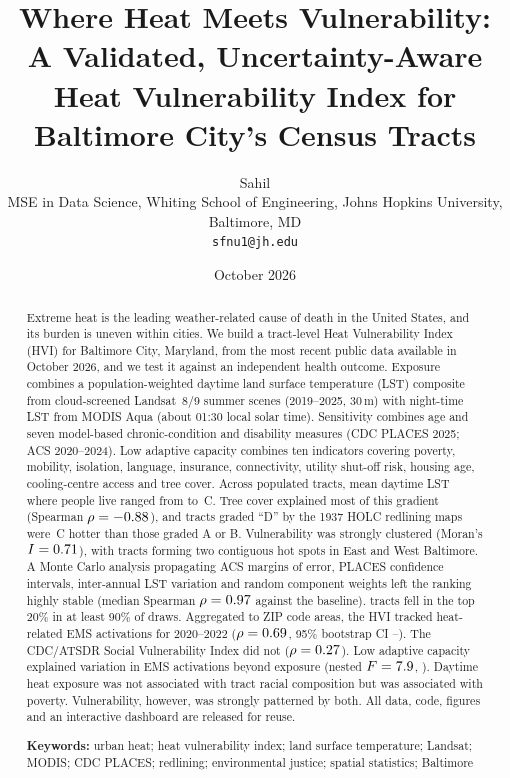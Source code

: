 \documentclass[11pt]{article}
\title{\textbf{Where Heat Meets Vulnerability:\\ A Validated, Uncertainty-Aware Heat Vulnerability Index for Baltimore City's Census Tracts}}
\author{Sahil\\[2pt]\small MSE in Data Science, Whiting School of Engineering, Johns Hopkins University, Baltimore, MD\\\small \texttt{sfnu1@jh.edu}}
\date{October 2026}
\newcommand{\degC}{\,\textdegree C}
\begin{document}
\maketitle

\begin{abstract}
\noindent Extreme heat is the leading weather-related cause of death in the United States, and its burden is uneven within cities. We build a tract-level Heat Vulnerability Index (HVI) for Baltimore City, Maryland, from the most recent public data available in October 2026, and we test it against an independent health outcome. Exposure combines a population-weighted daytime land surface temperature (LST) composite from \NScenesUsed{} cloud-screened Landsat~8/9 summer scenes (2019--2025, 30\,m) with night-time LST from MODIS Aqua (about 01:30 local solar time). Sensitivity combines age and seven model-based chronic-condition and disability measures (CDC PLACES 2025; ACS 2020--2024). Low adaptive capacity combines ten indicators covering poverty, mobility, isolation, language, insurance, connectivity, utility shut-off risk, housing age, cooling-centre access and tree cover. Across \NScored{} populated tracts, mean daytime LST where people live ranged from \LSTmin{} to \LSTmax\degC{}. Tree cover explained most of this gradient (Spearman $\rho=-0.88$), and tracts graded ``D'' by the 1937 HOLC redlining maps were \HolcDminusAB\degC{} hotter than those graded A or B. Vulnerability was strongly clustered (Moran's $I=0.71$), with \LisaHH{} tracts forming two contiguous hot spots in East and West Baltimore. A Monte Carlo analysis propagating ACS margins of error, PLACES confidence intervals, inter-annual LST variation and random component weights left the ranking highly stable (median Spearman $\rho=0.97$ against the baseline). \NRobust{} tracts fell in the top 20\% in at least 90\% of \MCdraws{} draws. Aggregated to \NZcta{} ZIP code areas, the HVI tracked heat-related EMS activations for 2020--2022 ($\rho=0.69$, 95\% bootstrap CI \ValHVIlo--\ValHVIhi). The CDC/ATSDR Social Vulnerability Index did not ($\rho=0.27$). Low adaptive capacity explained variation in EMS activations beyond exposure (nested $F=7.9$, \NestedFpEq{}). Daytime heat exposure was not associated with tract racial composition but was associated with poverty. Vulnerability, however, was strongly patterned by both. All data, code, figures and an interactive dashboard are released for reuse.

\medskip\noindent\textbf{Keywords:} urban heat; heat vulnerability index; land surface temperature; Landsat; MODIS; CDC PLACES; redlining; environmental justice; spatial statistics; Baltimore
\end{abstract}
\end{document}
